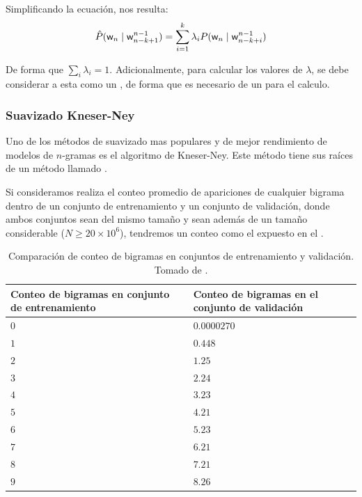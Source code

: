 Simplificando la ecuación, nos resulta:
\begin{equation}
  \hat{P}({\mathit{\mathsf{w}}}_n \mid {\mathit{\mathsf{w}}}_{n-k+1}^{n-1}) = \sum_{i=1}^{k} \lambda_i P({\mathit{\mathsf{w}}}_n \mid {\mathit{\mathsf{w}}}_{n-k+i}^{n-1})
\end{equation}

De forma que $\sum_i \lambda_i = 1$. Adicionalmente, para calcular los valores de $\lambda$, se debe considerar a esta como un , de forma que es necesario de un  para el calculo.

\subsubsection{Suavizado Kneser-Ney}
Uno de los métodos de suavizado mas populares y de mejor rendimiento de modelos de $n$-gramas es el algoritmo de Kneser-Ney. Este método tiene sus raíces de un método llamado .

Si consideramos realiza el conteo promedio de apariciones de cualquier bigrama dentro de un conjunto de entrenamiento y un conjunto de validación, donde ambos conjuntos sean del mismo tamaño y sean además de un tamaño considerable ($N \ge 20 \times 10^6$), tendremos un conteo como el expuesto en el .

\begin{table}[h!]
\centering
\begin{tabular}{| R{0.2\textwidth} | L{0.2\textwidth} |} \hline
  \textbf{Conteo de bigramas en conjunto de entrenamiento}          & \textbf{Conteo de bigramas en el conjunto de validación} \\ \hline
  $0$ & $0.0000270$ \\ \hline
  $1$ & $0.448$ \\ \hline
  $2$ & $1.25$ \\ \hline
  $3$ & $2.24$ \\ \hline
  $4$ & $3.23$ \\ \hline
  $5$ & $4.21$ \\ \hline
  $6$ & $5.23$ \\ \hline
  $7$ & $6.21$ \\ \hline
  $8$ & $7.21$ \\ \hline
  $9$ & $8.26$ \\ \hline
\end{tabular}
\caption[Comparación de conteo de bigramas en conjuntos de entrenamiento y validación]{Comparación de conteo de bigramas en conjuntos de entrenamiento y validación. Tomado de \cite{jurafsky-martin}.}
\label{table:bigram-train-vs-validation-count}
\end{table}

